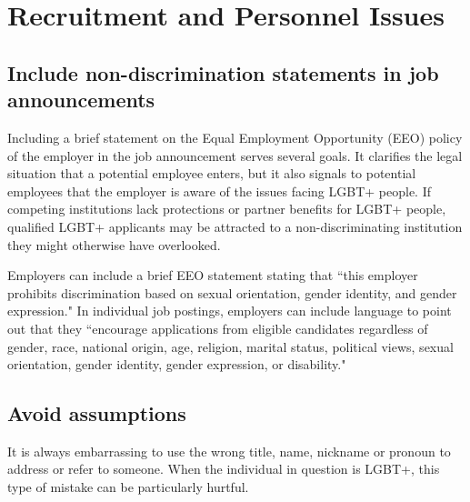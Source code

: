 %

\chapter{Recruitment and Personnel Issues}	%
\label{personnel-issues}		%
\normalsize			%

\section [Include non-discrimination statements in job announcements]{Include non-discrimination statements in job announcements}
\label{nondisc-statement}
Including a brief statement on the Equal Employment Opportunity (EEO) policy of the employer in the job announcement serves several goals. It clarifies the legal situation that a potential employee enters, but it also signals to potential employees that the employer is aware of the issues facing LGBT+ people. If competing institutions lack protections or partner benefits for LGBT+ people, qualified LGBT+ applicants may be attracted to a non-discriminating institution they might otherwise have overlooked.

Employers can include a brief EEO statement stating that ``this employer prohibits discrimination based on sexual orientation, gender identity, and gender expression." In individual job postings, employers can include language to point out that they ``encourage applications from eligible candidates regardless of gender, race, national origin, age, religion, marital status, political views, sexual orientation, gender identity, gender expression, or disability."

\newpage
\section {Avoid assumptions}
\label{assumptions}
It is always embarrassing to use the wrong title, name, nickname or pronoun to address or refer to someone. When the individual in question is LGBT+, this type of mistake can be particularly hurtful.


